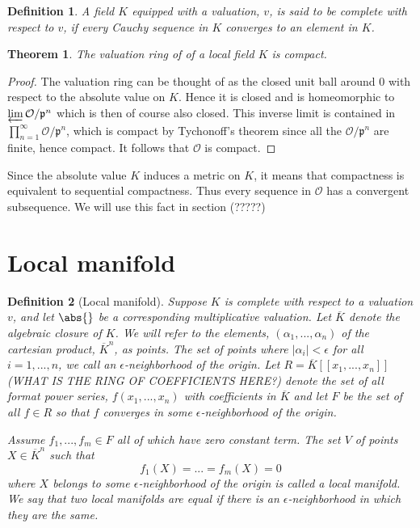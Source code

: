\documentclass{article}
\newtheorem{theorem}{Theorem}[section]
\newtheorem{definition}{Definition}[section]
\newcommand{\mfrak}[1]{\mathfrak{#1}}
\newcommand{\mcal}[1]{\mathcal{#1}}
\begin{document}
\begin{definition}
    A field $K$ equipped with a valuation, $v$, is said to be complete with respect to $v$, if every Cauchy sequence in $K$ converges to an element in $K$.
\end{definition}

\begin{theorem}
    The valuation ring of of a local field $K$ is compact.
\end{theorem}
\begin{proof}
    The valuation ring can be thought of as the closed unit ball around 0 with respect to the absolute value on $K$. Hence it is closed and is homeomorphic to $\varprojlim \mcal O / \mfrak p^n$ which is then of course also closed. This inverse limit is contained in $\prod_{n = 1}^\infty \mcal O / \mfrak p^n$, which is compact by Tychonoff's theorem since all the $\mcal O / \mfrak p^n$ are finite, hence compact. It follows that $\mcal O$ is compact.
\end{proof}
Since the absolute value $K$ induces a metric on $K$, it means that compactness is equivalent to sequential compactness. Thus every sequence in $\mcal O$ has a convergent subsequence. We will use this fact in section (?????)


\section{Local manifold}

\begin{definition}[Local manifold]
    Suppose $K$ is complete with respect to a valuation $v$, and let $\abs{}$ be a corresponding multiplicative valuation. Let $\overline K$ denote the algebraic closure of $K$. We will refer to the elements, $(\alpha_1, ..., \alpha_n)$ of the cartesian product, $\overline K^n$, as points. The set of points where $|\alpha_i| < \epsilon$ for all $i = 1, ..., n$, we call an $\epsilon$-neighborhood of the origin. Let $R = \overline K[[x_1, ..., x_n]]$ (WHAT IS THE RING OF COEFFICIENTS HERE?) denote the set of all format power series, $f(x_1, ..., x_n)$ with coefficients in $\overline K$ and let $F$ be the set of all $f \in R$ so that $f$ converges in some $\epsilon$-neighborhood of the origin.

    Assume $f_1, ..., f_m \in F$ all of which have zero constant term. The set $V$ of points $X \in \overline {K}^n$ such that $$f_1(X) = ... = f_m(X) = 0$$
    where $X$ belongs to some $\epsilon$-neighborhood of the origin is called a local manifold. We say that two local manifolds are equal if there is an $\epsilon$-neighborhood in which they are the same.
\end{definition}
\end{document}
